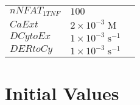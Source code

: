 \documentclass[a4paper,10.0pt]{article}
\begin{document}
{\begin{longtabu}{| l l l |}
  $nNFAT_{1 TNF}$\hspace{0.5cm} & $100$\hspace{0.5cm} & \hspace{0.5cm}\\
  $CaExt$\hspace{0.5cm} & $2\!\times\!10 ^{-3}\;\mathrm{M}$\hspace{0.5cm} & \hspace{0.5cm}\\
  $DCytoEx$\hspace{0.5cm} & $1\!\times\!10 ^{-3}\;\mathrm{s}^{-1}$\hspace{0.5cm} & \hspace{0.5cm}\\
  $DERtoCy$\hspace{0.5cm} & $1\!\times\!10 ^{-3}\;\mathrm{s}^{-1}$\hspace{0.5cm} & \hspace{0.5cm}\\
\hline
\end{longtabu}




\section*{Initial Values}

\label{sec:ODE_States}

}
\end{document}

